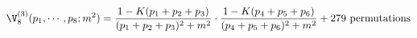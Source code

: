 \begin{equation}
\V_8^{(3)} (p_1,\cdots,p_8; m^2) = \frac{1 -
K(p_1+p_2+p_3)}{(p_1+p_2+p_3)^2 + m^2} \cdot \frac{1 - K(p_4 + p_5 +
p_6)}{(p_4+p_5+p_6)^2+m^2} + \text{279 permutations}
\end{equation}

